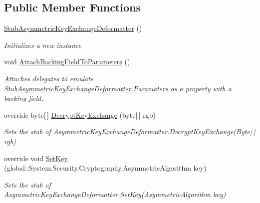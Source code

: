 \subsection*{Public Member Functions}
\begin{DoxyCompactItemize}
\item 
\hyperlink{class_system_1_1_security_1_1_cryptography_1_1_fakes_1_1_stub_asymmetric_key_exchange_deformatter_a7e2e3d1306408773600e8772d4eec0be}{Stub\-Asymmetric\-Key\-Exchange\-Deformatter} ()
\begin{DoxyCompactList}\small\item\em Initializes a new instance\end{DoxyCompactList}\item 
void \hyperlink{class_system_1_1_security_1_1_cryptography_1_1_fakes_1_1_stub_asymmetric_key_exchange_deformatter_a41e69e645f684443efc9db81379fe72d}{Attach\-Backing\-Field\-To\-Parameters} ()
\begin{DoxyCompactList}\small\item\em Attaches delegates to emulate \hyperlink{class_system_1_1_security_1_1_cryptography_1_1_fakes_1_1_stub_asymmetric_key_exchange_deformatter_a91739c10b113fc583c84ba1855d26671}{Stub\-Asymmetric\-Key\-Exchange\-Deformatter.\-Parameters} as a property with a backing field.\end{DoxyCompactList}\item 
override byte\mbox{[}$\,$\mbox{]} \hyperlink{class_system_1_1_security_1_1_cryptography_1_1_fakes_1_1_stub_asymmetric_key_exchange_deformatter_a2be997b9655bc73453658e701d0e8163}{Decrypt\-Key\-Exchange} (byte\mbox{[}$\,$\mbox{]} rgb)
\begin{DoxyCompactList}\small\item\em Sets the stub of Asymmetric\-Key\-Exchange\-Deformatter.\-Decrypt\-Key\-Exchange(\-Byte\mbox{[}$\,$\mbox{]} rgb)\end{DoxyCompactList}\item 
override void \hyperlink{class_system_1_1_security_1_1_cryptography_1_1_fakes_1_1_stub_asymmetric_key_exchange_deformatter_a9330df3ac4165026bf861cabcb99891a}{Set\-Key} (global\-::\-System.\-Security.\-Cryptography.\-Asymmetric\-Algorithm key)
\begin{DoxyCompactList}\small\item\em Sets the stub of Asymmetric\-Key\-Exchange\-Deformatter.\-Set\-Key(\-Asymmetric\-Algorithm key)\end{DoxyCompactList}\end{DoxyCompactItemize}
